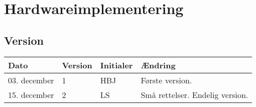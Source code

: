\chapter{Hardwareimplementering} \label{chap:Hardwareimplementering}

\section{Version}
\begin{table}[h]
	\centering
	\begin{tabularx}{\textwidth - 2cm}{|l|l| l|X|}
	\hline
	Dato	& Version	& Initialer & Ændring	\\ \hline
	03. december & 1 & HBJ	& Første version. \\ \hline
	15. december & 2 & LS & Små rettelser. Endelig version. \\ \hline
	\end{tabularx}
\end{table}






\clearpage






\clearpage
